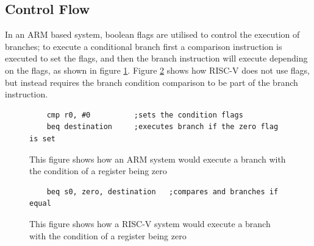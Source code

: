 \subsection{Control Flow}
In an ARM based system, boolean flags are utilised to control the execution of branches; to execute a conditional branch first a comparison instruction is executed to set the flags, and then the branch instruction will execute depending on the flags, as shown in figure \ref{fig:arm_branch}. Figure \ref{fig:riscv_branch} shows how RISC-V does not use flags, but instead requires the branch condition comparison to be part of the branch instruction.
\begin{figure}[H]
\begin{verbatim}
    cmp r0, #0          ;sets the condition flags
    beq destination     ;executes branch if the zero flag is set
\end{verbatim}
\caption[ARM branching code]{This figure shows how an ARM system would execute a branch with the condition of a register being zero}
\label{fig:arm_branch}
\end{figure}
\begin{figure}[H]
\begin{verbatim}
    beq s0, zero, destination   ;compares and branches if equal
\end{verbatim}
\caption[RISC-V branching code]{This figure shows how a RISC-V system would execute a branch with the condition of a register being zero}
\label{fig:riscv_branch}
\end{figure}

